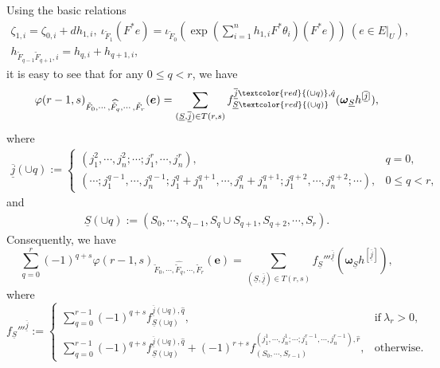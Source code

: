 \documentclass[12pt, a4paper]{article}
\begin{document}
Using the basic relations
$$
\begin{array}{c}
\zeta_{1,i}=\zeta_{0,i}+dh_{1,i},~\iota_{\tilde F_1}(F^*e)=\iota_{\tilde F_0}(\exp (\sum_{i=1}^nh_{1,i}F^*\theta_i)(F^*e))~(e\in E|_U),\\
h_{\tilde F_{q-1}\tilde F_{q+1},i}=h_{q,i}+h_{q+1,i},
\end{array}
$$
it is easy to see that for any $0\leq q<r$, we have
$$
\varphi(r-1,s)_{\tilde F_0,\cdots,\widehat{\tilde F_q},\cdots,\tilde F_r}(\boldsymbol{e})=\sum_{(\underline S,\underline{\overline j})\in T(r,s)}f_{\underline S\textcolor{red}{(\cup q)}}^{\underline{\overline j}\textcolor{red}{(\cup q)},\hat q}(\boldsymbol{\omega}_{\underline S}h^{[\underline{\overline j}]}),
$$
where
\begin{eqnarray}\label{cup j}
\underline{\overline j}(\cup q):=\left\{
\begin{matrix}
(j^2_1,\cdots,j^2_n;\cdots;j^r_1,\cdots,j^r_n),&q=0,\\
(\cdots;j^{q-1}_1,\cdots,j^{q-1}_n;j^q_1+j^{q+1}_n,\cdots,j^q_n+j^{q+1}_n;j^{q+2}_1,\cdots,j^{q+2}_n;\cdots),&0\leq q<r,
\end{matrix}
\right.
\end{eqnarray}
and
\begin{eqnarray}\label{cup s}
\underline S(\cup q):=(S_0,\cdots,S_{q-1},S_q\cup S_{q+1},S_{q+2},\cdots,S_r).
\end{eqnarray}
Consequently, we have
$$
\sum_{q=0}^r(-1)^{q+s}\varphi(r-1,s)_{\tilde F_0,\cdots,\widehat{\tilde F_q},\cdots,\tilde F_r}(\boldsymbol{e})=\sum_{(\underline S,\underline{\overline j})\in T(r,s)}f_{\underline S}'''^{\underline{\overline j}}(\boldsymbol{\omega}_{\underline S}h^{[\underline{\overline j}]}),
$$
where
$$
f_{\underline S}'''^{\underline{\overline j}}:=\left\{
\begin{matrix}
  \sum_{q=0}^{r-1}(-1)^{q+s}f_{\underline S(\cup q)}^{\underline{\overline j}(\cup q),\hat q},&\mathrm{if}~\lambda_r>0,\\
 \sum_{q=0}^{r-1}(-1)^{q+s}f_{\underline S(\cup q)}^{\underline{\overline j}(\cup q),\hat q}+(-1)^{r+s}f_{(S_0,\cdots,S_{r-1})}^{(j^1_1,\cdots,j^1_n;\cdots;j^{r-1}_1,\cdots,j^{r-1}_n),\hat r},&\mathrm{otherwise}.
\end{matrix}
\right.
$$
\end{document}
